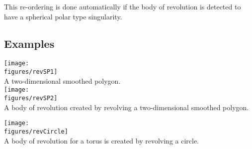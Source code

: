 This re-ordering is done automatically if the body of revolution is detected
to have a spherical polar type singularity.


\subsection{Examples}

\noindent
\begin{minipage}{.4\linewidth}
{\footnotesize
{}
}
\end{minipage}\hfill
\begin{minipage}{.6\linewidth}
  \begin{center}
   \texttt{[image: \\figures/revSP1]}\\
   {A two-dimensional smoothed polygon.} \\
   \texttt{[image: \\figures/revSP2]}\\
   {A body of revolution created by revolving a two-dimensional smoothed polygon.}
  \end{center}
\end{minipage} 

\begin{minipage}{.4\linewidth}
{\footnotesize
{}
}
\end{minipage}\hfill
\begin{minipage}{.6\linewidth}
  \begin{center}
   \texttt{[image: \\figures/revCircle]}\\
   {A body of revolution for a torus is created by revolving a circle.}
  \end{center}
\end{minipage}  \\






